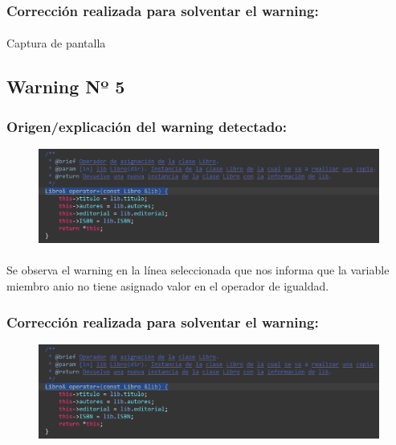 		\subsubsection{Corrección realizada para solventar el warning:}
		
			\paragraph{}Captura de pantalla
			
	\subsection{Warning Nº 5}
	
		\subsubsection{Origen/explicación del warning detectado:}
		
			\begin{figure}[H]
				\centering
				\includegraphics[scale=0.55]{img/esteban2.png}
				\label{esteban2}
			\end{figure}
		
			\paragraph{}Se observa el warning en la línea seleccionada que nos informa que la variable miembro anio no tiene asignado valor en el operador de igualdad.
			
		\subsubsection{Corrección realizada para solventar el warning:}
		
			\begin{figure}[H]
				\centering
				\includegraphics[scale=0.55]{img/esteban3.png}
				\label{esteban3}
			\end{figure}
		
